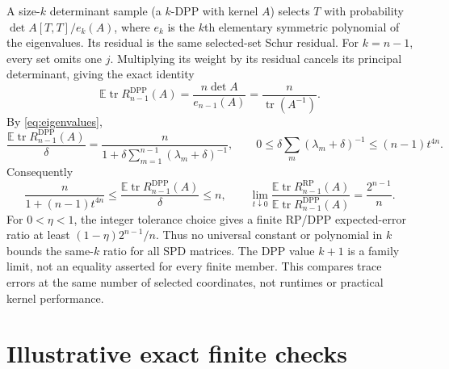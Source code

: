 \documentclass[10pt,letterpaper]{article}
\DeclareMathOperator{\tr}{tr}
\newcommand{\E}{\mathbb E}
\newcommand{\RP}{\mathrm{RP}}
\newcommand{\DPP}{\mathrm{DPP}}
\begin{document}
A size-$k$ determinant sample (a $k$-DPP with kernel $A$) selects $T$ with
probability $\det A[T,T]/e_k(A)$, where $e_k$ is the $k$th elementary
symmetric polynomial of the eigenvalues. Its residual is the same
selected-set Schur residual. For $k=n-1$, every set omits one $j$.
Multiplying its weight by its residual cancels its principal determinant,
giving the exact identity
\begin{equation}\label{eq:dpp-exact}
 \E\tr R_{n-1}^{\DPP}(A)
 =\frac{n\det A}{e_{n-1}(A)}=\frac n{\tr(A^{-1})}.
\end{equation}
By \eqref{eq:eigenvalues},
\[
 \frac{\E\tr R_{n-1}^{\DPP}(A)}{\delta}
 =\frac n{1+\delta\sum_{m=1}^{n-1}(\lambda_m+\delta)^{-1}},
 \qquad
 0\leq\delta\sum_m(\lambda_m+\delta)^{-1}
 \leq(n-1)t^{4n}.
\]
Consequently
\begin{equation}\label{eq:dpp-bounds}
 \frac n{1+(n-1)t^{4n}}
 \leq\frac{\E\tr R_{n-1}^{\DPP}(A)}{\delta}\leq n,
 \qquad
 \lim_{t\downarrow0}\frac{\E\tr R_{n-1}^{\RP}(A)}
 {\E\tr R_{n-1}^{\DPP}(A)}=\frac{2^{n-1}}n.
\end{equation}
For $0<\eta<1$, the integer tolerance choice gives a finite RP/DPP
expected-error ratio at least $(1-\eta)2^{n-1}/n$. Thus no universal
constant or polynomial in $k$ bounds the same-$k$ ratio for all SPD
matrices. The DPP value $k+1$ is a family limit, not an equality asserted
for every finite member. This compares trace errors at the same number
of selected coordinates, not runtimes or practical kernel performance.

\section{Illustrative exact finite checks}
\end{document}

